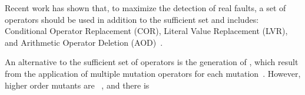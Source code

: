 Recent work has shown that, to maximize the detection of real faults, a set of operators should be used in addition to the sufficient set and includes: Conditional Operator Replacement (COR),
Literal Value Replacement (LVR), and Arithmetic Operator Deletion (AOD)~\cite{Kintis2018}. 

An alternative to the sufficient set of operators is the generation of , which result from the application of multiple mutation operators for each mutation~\cite{jia2009higher,kintis2010evaluating,offutt1992investigations,papadakis2010empirical}. However, higher order mutants are ~\cite{papadakis2010mutation,papadakis2019mutation}, and there is 

%
%
%


%
%


